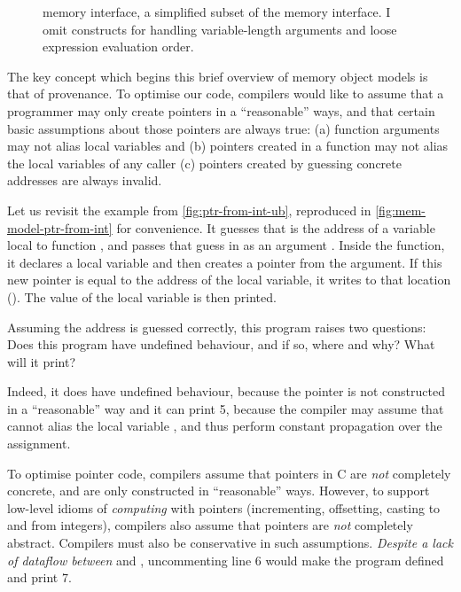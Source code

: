 \begin{figure}[tbhp]
    \small%
    \raggedright%
    \cngrammarcompressed{\textwidth}{%
        \cnkillXXkind{}\cnafterlastrule{}
    }
    \begingroup%
    \renewcommand{\cnprodline}{\cnprodlinecomment}
    \grammartabularSTY{%
        \cnaction{}\cninterrule{}
        \cnmemop{}\cnafterlastrule{}
    }
    \endgroup%
    \caption{ memory interface, a simplified subset of the 
        memory interface. I omit constructs for handling variable-length
        arguments and loose expression evaluation order.}\label{fig:mem-model-intf}
\end{figure}

The key concept which begins this brief overview of memory object models is
that of provenance. To optimise our code, compilers would like to assume that a
programmer may only create pointers in a ``reasonable'' ways, and that certain
basic assumptions about those pointers are always true: (a) function
arguments may not alias local variables and (b) pointers created in a function
may not alias the local variables of any caller (c) pointers created by
guessing concrete addresses are always invalid.

Let us revisit the example from \cref{fig:ptr-from-int-ub}, reproduced in
\cref{fig:mem-model-ptr-from-int} for convenience.  It guesses that
 is the address of a variable local to function
, and passes that guess in as an argument . Inside the  %
function, it declares a local variable  and then creates a pointer
 from the argument. If this new pointer is equal to the address of
the local variable, it writes to that location ().
The value of the local variable is then printed.

Assuming the address is guessed correctly, this program raises two questions:
Does this program have undefined behaviour, and if so, where and why?  What will
it print?

Indeed, it does have undefined behaviour, because the pointer  is not
constructed in a ``reasonable'' way and it can print 5, because the compiler may
assume that  cannot alias the local variable , and thus
perform constant propagation over the assignment.

To optimise pointer code, compilers assume that pointers in C are \emph{not}
completely concrete, and are only constructed in ``reasonable'' ways. However,
to support low-level idioms of \emph{computing} with pointers (incrementing,
offsetting, casting to and from integers), compilers also assume that pointers
are \emph{not} completely abstract.  Compilers must also be conservative in such
assumptions. \emph{Despite a lack of dataflow between}  and
, uncommenting line 6 would make the program defined and print 7.

